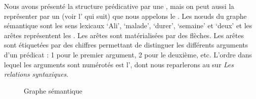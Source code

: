 Nous avons présenté la structure prédicative par une , mais on peut aussi la représenter par un  (voir l’ qui suit) que nous appelons le . Les nœuds du graphe sémantique sont les sens lexicaux ‘Ali’, ‘malade’, ‘durer’, ‘semaine’ et ‘deux’ et les arêtes représentent les . Les arêtes sont matérialisées par des flèches. Les arêtes sont étiquetées par des chiffres permettant de distinguer les différents arguments d’un prédicat : 1 pour le premier argument, 2 pour le deuxième, etc. L’ordre dans lequel les arguments sont numérotés est l’, dont nous reparlerons au  sur \textit{Les relations syntaxiques}.

\begin{figure}
\caption{\label{fig:Graphe sémantique}Graphe sémantique}
\end{figure}

